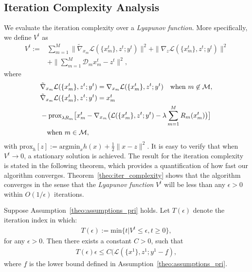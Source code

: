 \subsection{Iteration Complexity Analysis}
We evaluate the iteration complexity over a \emph{Lyapunov function}. More specifically, we define $V^t$ as
\begin{align}
    V^t:=&\sum_{m=1}^{M} \|\tilde{\nabla}_{x_m} \mathcal{L}(\{x_m^t\}, z^t; y^t)\|^2 + \|\nabla_z \mathcal{L}(\{x_m^t\}, z^t; y^t)\|^2\nonumber\\
    & + \|\sum_{m=1}^{M} \mathcal{D}_mx_m^t - z^t\|^2,\label{eq:Lyapunov}
\end{align}
where
\begin{align}
    & \tilde{\nabla}_{x_m} \mathcal{L}(\{x_m^t\}, z^t; y^t) = \nabla_{x_m} \mathcal{L}(\{x_m^t\}, z^t; y^t)\quad\hfill\text{when}~ m\not\in\mathcal{M},\nonumber\\
    & \tilde{\nabla}_{x_m} \mathcal{L}(\{x_m^t\}, z^t; y^t) = x_m^t\nonumber\\
    &  - \text{prox}_{\lambda R_m} \big[x_m^t-\nabla_{x_m}\big(\mathcal{L}(\{x_m^t\}, z^t; y^t) - \lambda\sum_{m=1}^{M} R_m(x_m^t)\big)\big]\nonumber\\ 
    &\quad\hfill \text{when} ~m\in\mathcal{M},\nonumber
\end{align}
with $\text{prox}_h[z] := \text{argmin}_x h(x)+\frac{1}{2}\|x-z\|^2$. It is easy to verify that when $V^t\rightarrow 0$, a stationary solution is achieved. The result for the iteration complexity is stated in the following theorem, which provides a quantification of how fast our algorithm converges. Theorem~\ref{theo:iter_complexity} shows that the algorithm converges in the sense that the \emph{Lyapunov function} $V^t$ will be less than any $\epsilon>0$ within $O(1/\epsilon)$ iterations. 
\begin{theorem}\label{theo:iter_complexity}
    Suppose Assumption~\ref{theo:assumptions_pri} holds. Let $T(\epsilon)$ denote the iteration index in which:
    \begin{align}
        T(\epsilon):=\text{min}\{t|V^t\le\epsilon, t\ge0\},\nonumber
    \end{align}
    for any $\epsilon>0$. Then there exists a constant $C>0$, such that
    \begin{align}
        T(\epsilon)\epsilon\le C(\mathcal{L}(\{x^1\}, z^1; y^1 - \underline{f}),
    \end{align}
    where $\underline{f}$ is the lower bound defined in Assumption~\ref{theo:assumptions_pri}.%
\end{theorem} 